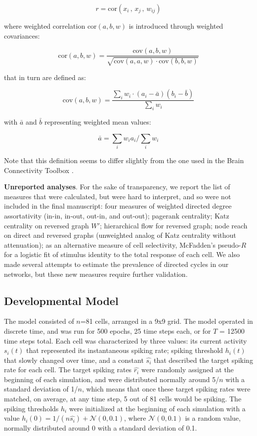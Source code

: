 \documentclass{article}
\begin{document}
\[ r=\text{cor}(x_i \, , \, x_j \, , \, w_{ij}) \]

where weighted correlation $\text{cor}(a,b,w)$ is introduced through weighted covariances: 

\[ \text{cor}(a,b,w) = \frac{\text{cov}(a,b,w)}{\sqrt{\text{cov}(a,a,w) \cdot \text{cov}(b,b,w)}} \]

that in turn are defined as: 

\[ \text{cov}(a,b,w) = \frac{\sum_i{w_i \cdot (a_i-\bar{a})(b_i-\bar{b})}}{\sum_i{w_i}} \]

with $\bar{a}$ and $\bar{b}$ representing weighted mean values: 

\[ \bar{a}=\sum_i{w_i a_i}/\sum_i{w_i} \]

Note that this definition seems to differ slightly from the one used in the Brain Connectivity Toolbox \citep{rubinov2010toolbox}.

\textbf{Unreported analyses}. For the sake of transparency, we report the list of measures that were calculated, but were hard to interpret, and so were not included in the final manuscript: four measures of weighted directed degree assortativity (in-in, in-out, out-in, and out-out); pagerank centrality; Katz centrality on reversed graph $W'$; hierarchical flow for reversed graph; node reach on direct and reversed graphs (unweighted analog of Katz centrality without attenuation); as an alternative measure of cell selectivity, McFadden’s pseudo-$R$ for a logistic fit of stimulus identity to the total response of each cell. We also made several attempts to estimate the prevalence of directed cycles in our networks, but these new measures require further validation.

\subsection*{Developmental Model}

The model consisted of $n$=81 cells, arranged in a 9x9 grid. The model operated in discrete time, and was run for 500 epochs, 25 time steps each, or for $T$ = 12500 time steps total. Each cell was characterized by three values: its current activity $s_i(t)$ that represented its instantaneous spiking rate; spiking threshold $h_i(t)$ that slowly changed over time, and a constant $\hat{s_i}$ that described the target spiking rate for each cell. The target spiking rates $\hat{r_i}$ were randomly assigned at the beginning of each simulation, and were distributed normally around 5/$n$ with a standard deviation of 1/$n$, which means that once these target spiking rates were matched, on average, at any time step, 5 out of 81 cells would be spiking. The spiking thresholds $h_i$ were initialized at the beginning of each simulation with a value $h_i(0) = 1/(n \hat{s_i}) + \mathcal{N}(0,0.1)$, where $\mathcal{N}(0,0.1)$ is a random value, normally distributed around 0 with a standard deviation of 0.1.
\end{document}
